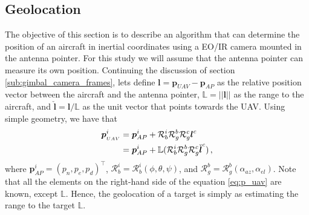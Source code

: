 \pagebreak
\subsection{Geolocation}{\label{geolocation}}
The objective of this section is to describe an algorithm that can determine the position of an aircraft in inertial coordinates using a EO/IR camera mounted in the antenna pointer. For this study we will assume that the antenna pointer can measure its own position.
Continuing the discussion of section \ref{sub:gimbal_camera_frames}, lets define $\boldsymbol{l}=\boldsymbol{p}_{UAV}-\boldsymbol{p}_{AP}$ as the relative position vector between the aircraft and the antenna pointer, $\mathbb{L}=\lvert\lvert \boldsymbol{l}\rvert\rvert$ as the range to the aircraft, and $\check{\boldsymbol{l}}=\boldsymbol{l}/\mathbb{L}$ as the unit vector that points towards the UAV. Using simple geometry, we have that
\begin{align}{\label{eq:p_uav}}
\boldsymbol{p}_{_{UAV}}^i&=\boldsymbol{p}_{AP}^i+\mathcal{R}_b^i\mathcal{R}_g^b\mathcal{R}_g^c\boldsymbol{l}^c\nonumber \\
&= \boldsymbol{p}_{AP}^i+\mathbb{L}(\mathcal{R}_b^i\mathcal{R}_g^b\mathcal{R}_g^c\check{\boldsymbol{l}}^c)\,,
\end{align}
where $\boldsymbol{p}_{AP}^i=(p_n,p_e,p_d)^\top$, $\mathcal{R}_b^i=\mathcal{R}_b^i(\phi,\theta,\psi)$, and $\mathcal{R}_g^b=\mathcal{R}_g^b(\alpha_{az},\alpha_{el})$. Note that all the elements on the right-hand side of the equation \ref{eq:p_uav} are known, except $\mathbb{L}$. Hence, the geolocation of a target is simply as estimating the range to the target $\mathbb{L}$.

